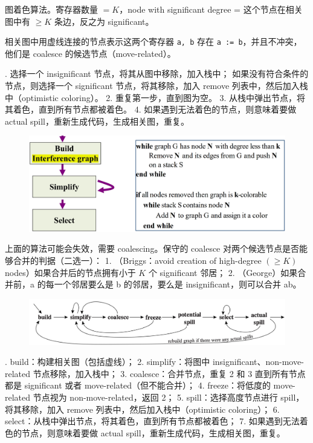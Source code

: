 \par \noindent 图着色算法。寄存器数量 $=K$，node with significant degree = 这个节点在相关图中有 $\geq K$ 条边，反之为 significant。

\par \noindent 相关图中用虚线连接的节点表示这两个寄存器 \texttt{a, b} 存在 \texttt{a := b}，并且不冲突，他们是 coalesce 的候选节点（move-related）。

\par {}. 选择一个 insignificant 节点，将其从图中移除，加入栈中；
如果没有符合条件的节点，则选择一个 significant 节点，将其移除，加入 remove 列表中，然后加入栈中（optimistic coloring）。
2. 重复第一步，直到图为空。
3. 从栈中弹出节点，将其着色，直到所有节点都被着色。
4. 如果遇到无法着色的节点，则意味着要做 actual spill，重新生成代码，生成相关图，重复。

\begin{figure}[H]
    \centering
    \includegraphics[width=0.8\linewidth]{figures/ra1.png}
\end{figure}

\par \noindent 上面的算法可能会失效，需要 coalescing。保守的 coalesce 对两个候选节点是否能够合并的判据（二选一）：
1. （Briggs：avoid creation of high-degree $(\geq K)$ nodes）如果合并后的节点拥有小于 $K$ 个 significant 邻居；
2. （George）如果合并前，a 的每一个邻居要么是 b 的邻居，要么是 insignificant，则可以合并 ab。

\begin{figure}[H]
    \centering
    \includegraphics[width=0.8\linewidth]{figures/ra2.png}
\end{figure}

\par {}. build：构建相关图（包括虚线）；
2. simplify：将图中 insignificant、non-move-related 节点移除，加入栈中；
3. coalesce：合并节点，重复 2 和 3 直到所有节点都是 significant 或者 move-related（但不能合并）；
4. freeze：将低度的 move-related 节点视为 non-move-related，返回 2；
5. spill：选择高度节点进行 spill，将其移除，加入 remove 列表中，然后加入栈中（optimistic coloring）；
6. select：从栈中弹出节点，将其着色，直到所有节点都被着色；
7. 如果遇到无法着色的节点，则意味着要做 actual spill，重新生成代码，生成相关图，重复。

